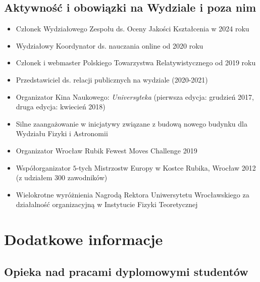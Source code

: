 \documentclass[12pt,a4paper]{article}
\begin{document}
\subsection{Aktywność i obowiązki na Wydziale i poza nim}

\begin{itemize}
	\item Członek Wydziałowego Zespołu ds. Oceny Jakości Kształcenia w 2024 roku
	\item Wydziałowy Koordynator ds. nauczania online od 2020 roku
	\item Członek i webmaster Polskiego Towarzystwa Relatywistycznego od 2019 roku
	\item Przedstawiciel ds. relacji publicznych na wydziale (2020-2021)
	\item Organizator Kina Naukowego: \textit{Universyteka} (pierwsza edycja: grudzień 2017, druga edycja: kwiecień 2018)
	\item Silne zaangażowanie w inicjatywy związane z budową nowego budynku dla Wydziału Fizyki i Astronomii
	\item Organizator Wrocław Rubik Fewest Moves Challenge 2019
	\item Współorganizator $5$-tych Mistrzostw Europy w Kostce Rubika, Wrocław 2012 (z udziałem 300 zawodników)
	\item Wielokrotne wyróżnienia Nagrodą Rektora Uniwersytetu Wrocławskiego za działalność organizacyjną w Instytucie Fizyki Teoretycznej
\end{itemize}

\section{Dodatkowe informacje}


\subsection*{Opieka nad pracami dyplomowymi studentów}
\end{document}
